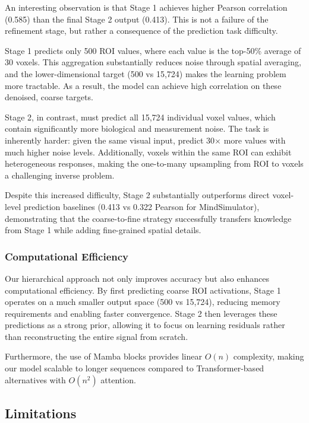 An interesting observation is that Stage 1 achieves higher Pearson correlation (0.585)
than the final Stage 2 output (0.413).
This is not a failure of the refinement stage, but rather a consequence of the prediction task difficulty.

Stage 1 predicts only 500 ROI values, where each value is the top-50\% average of 30 voxels.
This aggregation substantially reduces noise through spatial averaging,
and the lower-dimensional target (500 vs 15,724) makes the learning problem more tractable.
As a result, the model can achieve high correlation on these denoised, coarse targets.

Stage 2, in contrast, must predict all 15,724 individual voxel values,
which contain significantly more biological and measurement noise.
The task is inherently harder: given the same visual input,
predict 30$\times$ more values with much higher noise levels.
Additionally, voxels within the same ROI can exhibit heterogeneous responses,
making the one-to-many upsampling from ROI to voxels a challenging inverse problem.

Despite this increased difficulty, Stage 2 substantially outperforms direct voxel-level prediction baselines
(0.413 vs 0.322 Pearson for MindSimulator),
demonstrating that the coarse-to-fine strategy successfully transfers knowledge from Stage 1
while adding fine-grained spatial details.

\subsubsection{Computational Efficiency}

Our hierarchical approach not only improves accuracy but also enhances computational efficiency.
By first predicting coarse ROI activations, Stage 1 operates on a much smaller output space (500 vs 15,724),
reducing memory requirements and enabling faster convergence.
Stage 2 then leverages these predictions as a strong prior,
allowing it to focus on learning residuals rather than reconstructing the entire signal from scratch.

Furthermore, the use of Mamba blocks provides linear $O(n)$ complexity,
making our model scalable to longer sequences compared to Transformer-based alternatives with $O(n^2)$ attention.


\subsection{Limitations}

